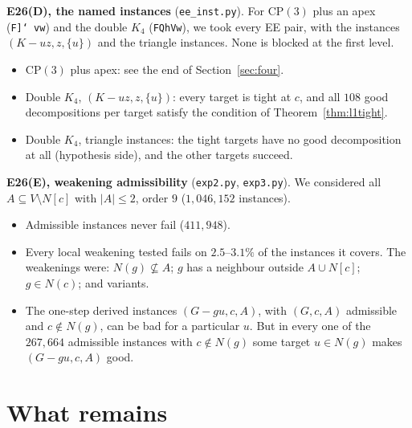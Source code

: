 \documentclass[11pt]{amsart}
\theoremstyle{definition}
\begin{document}
\textbf{E26(D), the named instances} (\texttt{ee\_inst.py}). For $\mathrm{CP}(3)$ plus an apex
(\texttt{F]\char`~vw}) and the double $K_4$ (\texttt{FQhVw}), we took every EE pair, with the
instances $(K-uz,z,\{u\})$ and the triangle instances. None is blocked at the first level.
\begin{itemize}
\item $\mathrm{CP}(3)$ plus apex: see the end of Section~\ref{sec:four}.
\item Double $K_4$, $(K-uz,z,\{u\})$: every target is tight at $c$, and all $108$ good decompositions
per target satisfy the condition of Theorem~\ref{thm:l1tight}.
\item Double $K_4$, triangle instances: the tight targets have no good decomposition at all
(hypothesis side), and the other targets succeed.
\end{itemize}

\textbf{E26(E), weakening admissibility} (\texttt{exp2.py}, \texttt{exp3.py}). We considered all
$A\subseteq V\setminus N[c]$ with $|A|\le2$, order $9$ ($1{,}046{,}152$ instances).
\begin{itemize}
\item Admissible instances never fail ($411{,}948$).
\item Every local weakening tested fails on $2.5$--$3.1\%$ of the instances it covers. The weakenings
were: $N(g)\not\subseteq A$; $g$ has a neighbour outside $A\cup N[c]$; $g\in N(c)$; and variants.
\item The one-step derived instances $(G-gu,c,A)$, with $(G,c,A)$ admissible and $c\notin N(g)$, can
be bad for a particular $u$. But in every one of the $267{,}664$ admissible instances with $c\notin N(g)$ some target
$u\in N(g)$ makes $(G-gu,c,A)$ good.
\end{itemize}

\section{What remains}\label{sec:open}
\end{document}
